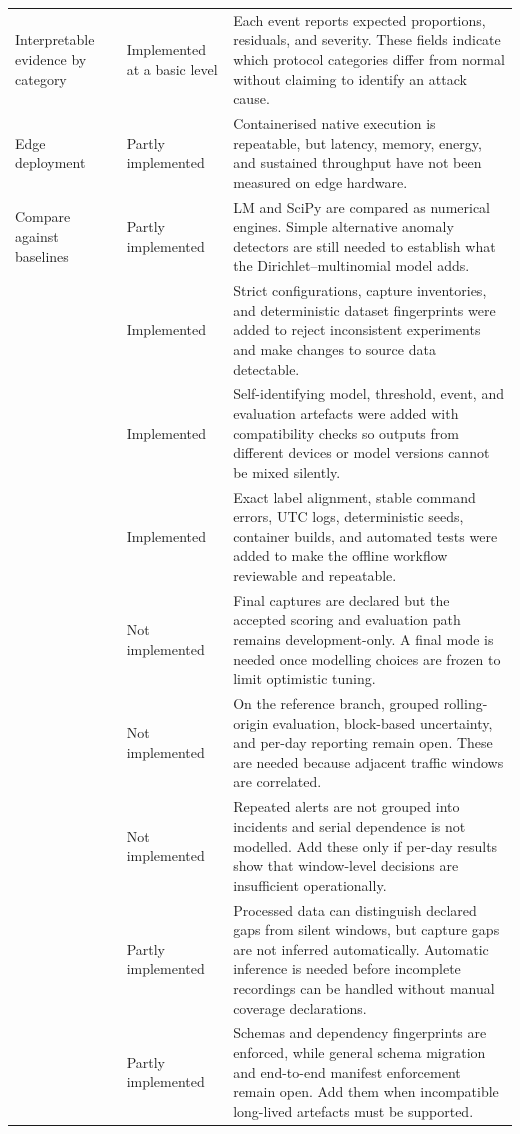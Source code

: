 \documentclass[11pt,a4paper]{article}
\begin{document}
\begin{longtable}{>{\raggedright\arraybackslash}p{} >{\raggedright\arraybackslash}p{} >{\raggedright\arraybackslash}p{}}
Interpretable evidence by category & Implemented at a basic level & Each event reports expected proportions, residuals, and severity. These fields indicate which protocol categories differ from normal without claiming to identify an attack cause. \\
Edge deployment & Partly implemented & Containerised native execution is repeatable, but latency, memory, energy, and sustained throughput have not been measured on edge hardware. \\
Compare against baselines & Partly implemented & LM and SciPy are compared as numerical engines. Simple alternative anomaly detectors are still needed to establish what the Dirichlet--multinomial model adds. \\
{} & Implemented & Strict configurations, capture inventories, and deterministic dataset fingerprints were added to reject inconsistent experiments and make changes to source data detectable. \\
{} & Implemented & Self-identifying model, threshold, event, and evaluation artefacts were added with compatibility checks so outputs from different devices or model versions cannot be mixed silently. \\
{} & Implemented & Exact label alignment, stable command errors, UTC logs, deterministic seeds, container builds, and automated tests were added to make the offline workflow reviewable and repeatable. \\
{} & Not implemented & Final captures are declared but the accepted scoring and evaluation path remains development-only. A final mode is needed once modelling choices are frozen to limit optimistic tuning. \\
{} & Not implemented & On the reference branch, grouped rolling-origin evaluation, block-based uncertainty, and per-day reporting remain open. These are needed because adjacent traffic windows are correlated. \\
{} & Not implemented & Repeated alerts are not grouped into incidents and serial dependence is not modelled. Add these only if per-day results show that window-level decisions are insufficient operationally. \\
{} & Partly implemented & Processed data can distinguish declared gaps from silent windows, but capture gaps are not inferred automatically. Automatic inference is needed before incomplete recordings can be handled without manual coverage declarations. \\
{} & Partly implemented & Schemas and dependency fingerprints are enforced, while general schema migration and end-to-end manifest enforcement remain open. Add them when incompatible long-lived artefacts must be supported. \\
\bottomrule
\end{longtable}
\end{document}

